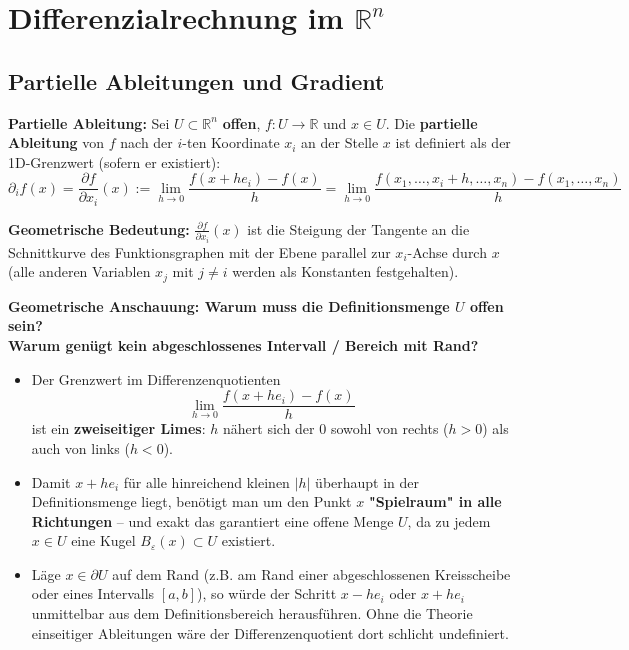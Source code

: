 \section{Differenzialrechnung im $\mathbb{R}^n$}

\subsection{Partielle Ableitungen und Gradient}

\begin{definition}
    \textbf{Partielle Ableitung:} Sei $U \subset \mathbb{R}^n$ \textbf{offen}, $f: U \to \mathbb{R}$ und $x \in U$. Die \textbf{partielle Ableitung} von $f$ nach der $i$-ten Koordinate $x_i$ an der Stelle $x$ ist definiert als der 1D-Grenzwert (sofern er existiert):
    $$ \partial_i f(x) = \frac{\partial f}{\partial x_i}(x) := \lim_{h \to 0} \frac{f(x + h e_i) - f(x)}{h} = \lim_{h \to 0} \frac{f(x_1, \dots, x_i + h, \dots, x_n) - f(x_1, \dots, x_n)}{h} $$
\end{definition}

\begin{remark}
    \textbf{Geometrische Bedeutung:} $\frac{\partial f}{\partial x_i}(x)$ ist die Steigung der Tangente an die Schnittkurve des Funktionsgraphen mit der Ebene parallel zur $x_i$-Achse durch $x$ (alle anderen Variablen $x_j$ mit $j \neq i$ werden als Konstanten festgehalten).
\end{remark}

\begin{remark}
    \textbf{Geometrische Anschauung: Warum muss die Definitionsmenge $U$ offen sein?} \\
    \textbf{Warum genügt kein abgeschlossenes Intervall / Bereich mit Rand?}
    \begin{itemize}
        \item Der Grenzwert im Differenzenquotienten
        $$ \lim_{h \to 0} \frac{f(x + h e_i) - f(x)}{h} $$
        ist ein \textbf{zweiseitiger Limes}: $h$ nähert sich der $0$ sowohl von rechts ($h > 0$) als auch von links ($h < 0$).
        \item Damit $x + h e_i$ für alle hinreichend kleinen $|h|$ überhaupt in der Definitionsmenge liegt, benötigt man um den Punkt $x$ \textbf{"Spielraum" in alle Richtungen} – und exakt das garantiert eine offene Menge $U$, da zu jedem $x \in U$ eine Kugel $B_\varepsilon(x) \subset U$ existiert.
        \item Läge $x \in \partial U$ auf dem Rand (z.B. am Rand einer abgeschlossenen Kreisscheibe oder eines Intervalls $[a, b]$), so würde der Schritt $x - h e_i$ oder $x + h e_i$ unmittelbar aus dem Definitionsbereich herausführen. Ohne die Theorie einseitiger Ableitungen wäre der Differenzenquotient dort schlicht undefiniert.
    \end{itemize}
\end{remark}


